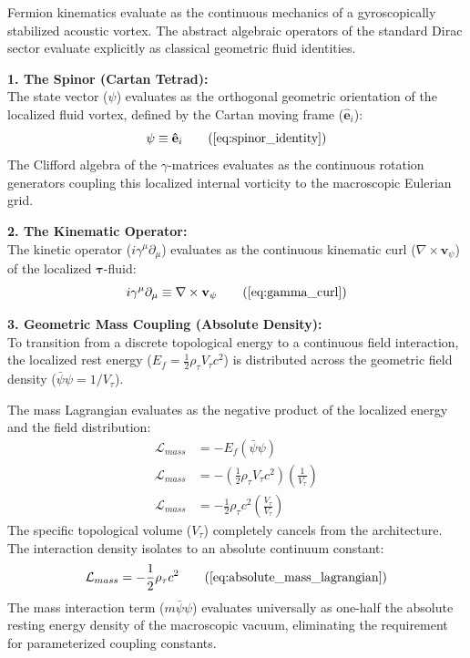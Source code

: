 \documentclass[11pt, a4paper]{article}
\begin{document}
Fermion kinematics evaluate as the continuous mechanics of a gyroscopically stabilized acoustic vortex. The abstract algebraic operators of the standard Dirac sector evaluate explicitly as classical geometric fluid identities.

\textbf{1. The Spinor (Cartan Tetrad):} \\
The state vector ($\psi$) evaluates as the orthogonal geometric orientation of the localized fluid vortex, defined by the Cartan moving frame ($\mathbf{\hat{e}}_i$):
\begin{equation}
    \psi \equiv \mathbf{\hat{e}}_i \tag{\ref{eq:spinor_identity}}
\end{equation}
The Clifford algebra of the $\gamma$-matrices evaluates as the continuous rotation generators coupling this localized internal vorticity to the macroscopic Eulerian grid. 

\textbf{2. The Kinematic Operator:} \\
The kinetic operator ($i\gamma^\mu \partial_\mu$) evaluates as the continuous kinematic curl ($\nabla \times \mathbf{v}_\psi$) of the localized $\boldsymbol{\tau}$-fluid:
\begin{equation}
    i\gamma^\mu \partial_\mu \equiv \nabla \times \mathbf{v}_\psi \tag{\ref{eq:gamma_curl}}
\end{equation}

\textbf{3. Geometric Mass Coupling (Absolute Density):} \\
To transition from a discrete topological energy to a continuous field interaction, the localized rest energy ($E_f = \frac{1}{2} \rho_{\tau} V_{\tau} c^2$) is distributed across the geometric field density ($\bar{\psi} \psi = 1 / V_{\tau}$). 

The mass Lagrangian evaluates as the negative product of the localized energy and the field distribution:
\begin{align}
    \mathcal{L}_{mass} &= - E_f (\bar{\psi} \psi) \nonumber \\
    \mathcal{L}_{mass} &= - \left( \frac{1}{2} \rho_{\tau} V_{\tau} c^2 \right) \left( \frac{1}{V_{\tau}} \right)  \\
    \mathcal{L}_{mass} &= - \frac{1}{2} \rho_{\tau} c^2 \left( \frac{V_{\tau}}{V_{\tau}} \right) 
\end{align}
The specific topological volume ($V_{\tau}$) completely cancels from the architecture. The interaction density isolates to an absolute continuum constant:
\begin{equation}
    \mathcal{L}_{mass} = - \frac{1}{2} \rho_{\tau} c^2 \tag{\ref{eq:absolute_mass_lagrangian}}
\end{equation}
The mass interaction term ($m\bar{\psi}\psi$) evaluates universally as one-half the absolute resting energy density of the macroscopic vacuum, eliminating the requirement for parameterized coupling constants.
\end{document}
